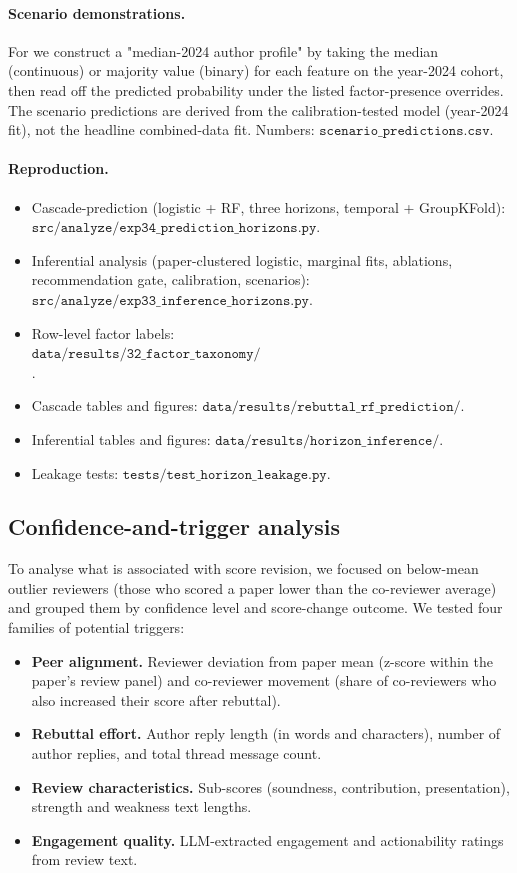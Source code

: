 \documentclass{article}
\newcommand{\code}[1]{\texttt{#1}}
\begin{document}
\paragraph{Scenario demonstrations.} For  we construct a "median-2024 author profile" by taking the median (continuous) or majority value (binary) for each feature on the year-2024 cohort, then read off the predicted probability under the listed factor-presence overrides. The scenario predictions are derived from the calibration-tested model (year-2024 fit), not the headline combined-data fit. Numbers: $\code{scenario\_predictions.csv}$.

\paragraph{Reproduction.}
\begin{itemize}[itemsep=0pt,topsep=2pt]
  \item Cascade-prediction (logistic + RF, three horizons, temporal + GroupKFold): $\code{src/analyze/exp34\_prediction\_horizons.py}$.
  \item Inferential analysis (paper-clustered logistic, marginal fits, ablations, recommendation gate, calibration, scenarios): $\code{src/analyze/exp33\_inference\_horizons.py}$.
  \item Row-level factor labels: $\code{data/results/32\_factor\_taxonomy/interaction\_factor\_labels\_\{2024,2025\}.csv}$.
  \item Cascade tables and figures: $\code{data/results/rebuttal\_rf\_prediction/}$.
  \item Inferential tables and figures: $\code{data/results/horizon\_inference/}$.
  \item Leakage tests: $\code{tests/test\_horizon\_leakage.py}$.
\end{itemize}

\subsection{Confidence-and-trigger analysis}\label{app:confidence-triggers}

To analyse what is associated with score revision, we focused on below-mean outlier reviewers (those who scored a paper lower than the co-reviewer average) and grouped them by confidence level and score-change outcome. We tested four families of potential triggers:
\begin{itemize}[itemsep=0pt,topsep=2pt]
  \item \textbf{Peer alignment.} Reviewer deviation from paper mean (z-score within the paper's review panel) and co-reviewer movement (share of co-reviewers who also increased their score after rebuttal).
  \item \textbf{Rebuttal effort.} Author reply length (in words and characters), number of author replies, and total thread message count.
  \item \textbf{Review characteristics.} Sub-scores (soundness, contribution, presentation), strength and weakness text lengths.
  \item \textbf{Engagement quality.} LLM-extracted engagement and actionability ratings from review text.
\end{itemize}
\end{document}
